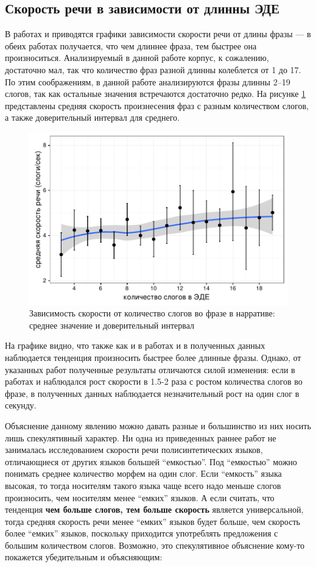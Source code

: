 \subsection{Скорость речи в зависимости от длинны ЭДЕ}
\noindent В работах \citep{fonagy60} и \citep{stepanova11} приводятся графики зависимости скорости речи от длины фразы --- в обеих работах получается, что чем длиннее фраза, тем быстрее она произноситься. Анализируемый в данной работе корпус, к сожалению, достаточно мал, так что количество фраз разной длинны колеблется от 1 до 17. По этим соображениям, в данной работе анализируются фразы длинны 2--19 слогов, так как остальные значения встречаются достаточно редко. На рисунке \ref{ratenumsyl} представлены средняя скорость произнесения фраз с разным количеством слогов, а также доверительный интервал для среднего.
\begin{figure}[t!]
        \includegraphics[width=\linewidth]{ratenumsyl.pdf}
\caption{Зависимость скорости от количество слогов во фразе в нарративе: среднее значение и доверительный интервал}
        \label{ratenumsyl}
\end{figure}
\par На графике видно, что также как и в работах \citep{fonagy60} и \citep{stepanova11} в полученных данных наблюдается тенденция произносить быстрее более длинные фразы. Однако, от указанных работ полученные результаты отличаются силой изменения: если в работах \citep{fonagy60} и \citep{stepanova11} наблюдался рост скорости в 1.5-2 раза с ростом количества слогов во фразе, в полученных данных наблюдается незначительный рост на один слог в секунду.
\par Объяснение данному явлению можно давать разные и большинство из них носить лишь спекулятивный характер. Ни одна из приведенных раннее работ не занималась исследованием скорости речи полисинтетических языков, отличающиеся от других языков большей ``емкостью''. Под ``емкостью'' можно понимать среднее количество морфем на один слог. Если ``емкость'' языка высокая, то тогда носителям такого языка чаще всего надо меньше слогов произносить, чем носителям менее ``емких'' языков. А если считать, что тенденция \textbf{чем больше слогов, тем больше скорость} является универсальной, тогда средняя скорость речи менее ``емких'' языков будет больше, чем скорость более ``емких'' языков, поскольку приходится употреблять предложения с большим количеством слогов. Возможно, это спекулятивное объяснение кому-то покажется убедительным и объясняющим:

